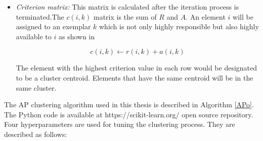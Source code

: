 \begin{itemize}
  \item\textit{Criterion matrix:} This matrix is calculated after the iteration process is terminated.The $c (i,k)$ matrix is the sum of $R$ and $A$. An element $i$ will be assigned to an exemplar $k$ which is not only highly responsible but also highly available to $i$  as shown in 
    
    \begin{equation}
        c(i, k) \leftarrow r(i, k) + a(i, k)
    \end{equation}
    
  

The element with the highest criterion value in each row would be designated to be a cluster centroid. Elements that have the same centroid will be in the same cluster.







\end{itemize}

The AP clustering algorithm used in this thesis is described in Algorithm \ref{APo}. The Python code is available at https://scikit-learn.org/ open source repository. Four hyperparameters are used for tuning the clustering process. They are described as follows: 

